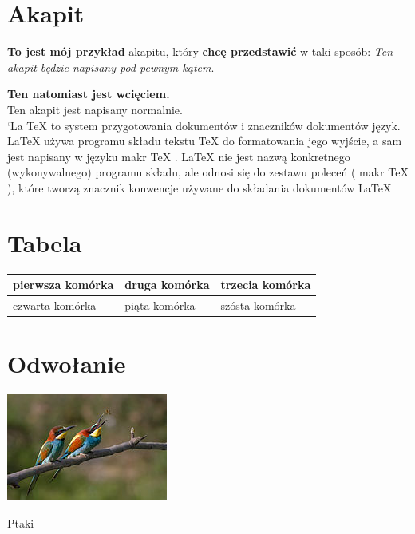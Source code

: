 \documentclass{article}
\begin{document}
\section{Akapit}

\underline{\textbf{To jest mój przykład}} akapitu, który \underline{\textbf{chcę przedstawić}} w taki sposób: 
\emph{Ten akapit będzie napisany pod pewnym kątem}. \par \textbf{Ten natomiast jest wcięciem.} 
\\
Ten akapit jest napisany normalnie.
\\

`La \TeX {} to system przygotowania dokumentów i znaczników dokumentów
język. \LaTeX {} używa programu składu tekstu \TeX {} do formatowania
jego wyjście, a sam jest napisany w języku makr 
 \TeX {} . \LaTeX {} nie jest nazwą konkretnego (wykonywalnego) programu składu, ale
odnosi się do zestawu poleceń ( makr \TeX {} ), które tworzą znacznik
konwencje używane do składania dokumentów \LaTeX {} 

\section{Tabela}
\begin{tabularx}{0.8\textwidth} { 
  | >{\raggedright\arraybackslash}X 
  | >{\centering\arraybackslash}X 
  | >{\raggedleft\arraybackslash}X | }
 \hline
 pierwsza komórka & druga komórka & trzecia komórka \\
 \hline
 czwarta komórka  & piąta komórka & szósta komórka  \\
\hline
\end{tabularx}
\section{Odwołanie}
\begin { rysunek }[h!]
   \includegraphics[skala=1.7]{Pictures/birds.jpg}
  \caption { Ptaki } 
  \label { rys:ptaki } 
\end { rysunek }
\end{document}
